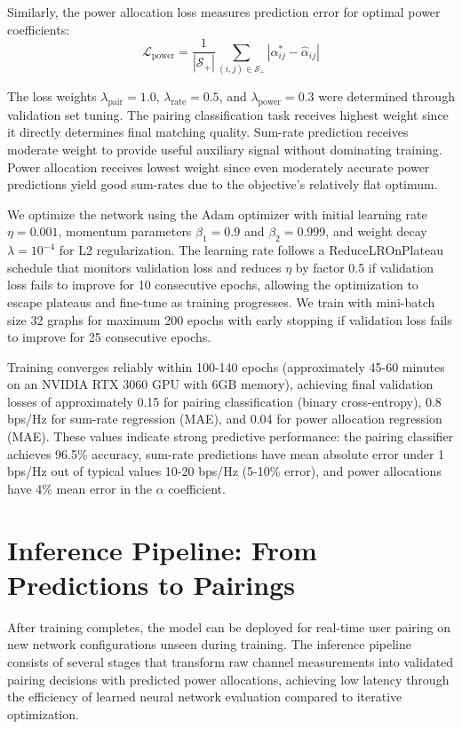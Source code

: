 Similarly, the power allocation loss measures prediction error for optimal power coefficients:
\begin{equation}
\mathcal{L}_{\text{power}} = \frac{1}{|\mathcal{S}_+|} \sum_{(i,j) \in \mathcal{S}_+} |\alpha_{ij}^* - \hat{\alpha}_{ij}|
\end{equation}

The loss weights $\lambda_{\text{pair}} = 1.0$, $\lambda_{\text{rate}} = 0.5$, and $\lambda_{\text{power}} = 0.3$ were determined through validation set tuning. The pairing classification task receives highest weight since it directly determines final matching quality. Sum-rate prediction receives moderate weight to provide useful auxiliary signal without dominating training. Power allocation receives lowest weight since even moderately accurate power predictions yield good sum-rates due to the objective's relatively flat optimum.

We optimize the network using the Adam optimizer with initial learning rate $\eta = 0.001$, momentum parameters $\beta_1 = 0.9$ and $\beta_2 = 0.999$, and weight decay $\lambda = 10^{-4}$ for L2 regularization. The learning rate follows a ReduceLROnPlateau schedule that monitors validation loss and reduces $\eta$ by factor 0.5 if validation loss fails to improve for 10 consecutive epochs, allowing the optimization to escape plateaus and fine-tune as training progresses. We train with mini-batch size 32 graphs for maximum 200 epochs with early stopping if validation loss fails to improve for 25 consecutive epochs.

Training converges reliably within 100-140 epochs (approximately 45-60 minutes on an NVIDIA RTX 3060 GPU with 6GB memory), achieving final validation losses of approximately 0.15 for pairing classification (binary cross-entropy), 0.8 bps/Hz for sum-rate regression (MAE), and 0.04 for power allocation regression (MAE). These values indicate strong predictive performance: the pairing classifier achieves 96.5\% accuracy, sum-rate predictions have mean absolute error under 1 bps/Hz out of typical values 10-20 bps/Hz (5-10\% error), and power allocations have 4\% mean error in the $\alpha$ coefficient.

\section{Inference Pipeline: From Predictions to Pairings}

After training completes, the model can be deployed for real-time user pairing on new network configurations unseen during training. The inference pipeline consists of several stages that transform raw channel measurements into validated pairing decisions with predicted power allocations, achieving low latency through the efficiency of learned neural network evaluation compared to iterative optimization.


